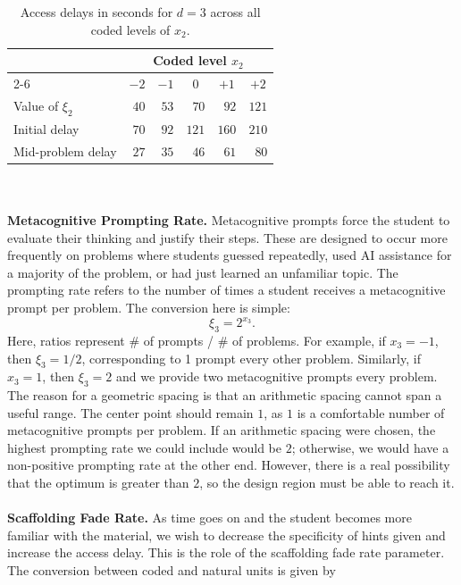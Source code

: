 \documentclass[12pt]{article}
\begin{document}
\begin{table}[H]
\centering
\begin{tabular}{@{}lrrrrr@{}}
\toprule
& \multicolumn{5}{c}{Coded level $x_2$} \\
\cmidrule(l){2-6}
& \multicolumn{1}{c}{$-2$} & \multicolumn{1}{c}{$-1$}
& \multicolumn{1}{c}{$0$}  & \multicolumn{1}{c}{$+1$}
& \multicolumn{1}{c}{$+2$} \\
\midrule
Value of $\xi_2$  & $40$ & $53$ & $70$  & $92$  & $121$ \\
Initial delay     & $70$ & $92$ & $121$ & $160$ & $210$ \\
Mid-problem delay & $27$ & $35$ & $46$  & $61$  & $80$  \\
\bottomrule
\end{tabular}
\caption{Access delays in seconds for $d=3$ across all coded levels of $x_2$.}
\label{tab:access-delay}
\end{table}
\\\\
\noindent \textbf{Metacognitive Prompting Rate.} Metacognitive prompts force the student to evaluate their thinking and justify their steps. These are designed to occur more frequently on problems where students guessed repeatedly, used AI assistance for a majority of the problem, or had just learned an unfamiliar topic. The prompting rate refers to the number of times a student receives a metacognitive prompt per problem. The conversion here is simple:
\[\xi_3 = 2^{x_3}.\] Here, ratios represent \# of prompts / \# of problems. For example, if $x_3=-1$, then $\xi_3 = 1/2$, corresponding to 1 prompt every other problem. Similarly, if $x_3=1$, then $\xi_3 = 2$ and we provide two metacognitive prompts every problem. The reason for a geometric spacing is that an arithmetic spacing cannot span a useful range. The center point should remain $1$, as $1$ is a comfortable number of metacognitive prompts per problem. If an arithmetic spacing were chosen, the highest prompting rate we could include would be $2$; otherwise, we would have a non-positive prompting rate at the other end. However, there is a real possibility that the optimum is greater than $2$, so the design region must be able to reach it.
\\\\
\textbf{Scaffolding Fade Rate.} As time goes on and the student becomes more familiar with the material, we wish to decrease the specificity of hints given and increase the access delay. This is the role of the scaffolding fade rate parameter. The conversion between coded and natural units is given by
\end{document}
